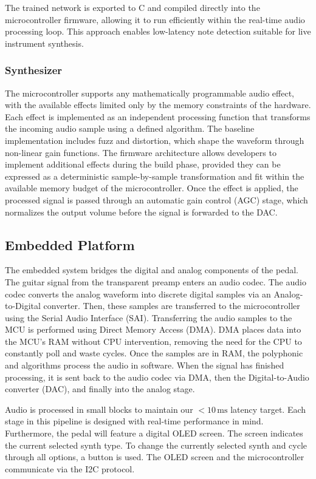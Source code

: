 \documentclass[12pt]{article}
\begin{document}
The trained network is exported to C and compiled directly into the microcontroller firmware, allowing it to run efficiently within the real-time audio processing loop. This approach enables low-latency note detection suitable for live instrument synthesis.
\subsubsection{Synthesizer}

The microcontroller supports any mathematically programmable audio effect, with the available effects limited only by the memory constraints of the hardware. Each effect is implemented as an independent processing function that transforms the incoming audio sample using a defined algorithm. The baseline implementation includes fuzz and distortion, which shape the waveform through non-linear gain functions. The firmware architecture allows developers to implement additional effects during the build phase, provided they can be expressed as a deterministic sample-by-sample transformation and fit within the available memory budget of the microcontroller. Once the effect is applied, the processed signal is passed through an automatic gain control (AGC) stage, which normalizes the output volume before the signal is forwarded to the DAC.

\subsection{Embedded Platform}
The embedded system bridges the digital and analog components of the pedal. The guitar signal from the transparent preamp enters an audio codec. The audio codec converts the analog waveform into discrete digital samples via an Analog-to-Digital converter. Then, these samples are transferred to the microcontroller using the Serial Audio Interface (SAI). Transferring the audio samples to the MCU is performed using Direct Memory Access (DMA). DMA places data into the MCU's RAM without CPU intervention, removing the need for the CPU to constantly poll and waste cycles. Once the samples are in RAM, the polyphonic and algorithms process the audio in software. When the signal has finished processing, it is sent back to the audio codec via DMA, then the Digital-to-Audio converter (DAC), and finally into the analog stage.

Audio is processed in small blocks to maintain our $<10\,\text{ms}$ latency target. Each stage in this pipeline is designed with real-time performance in mind. Furthermore, the pedal will feature a digital OLED screen. The screen indicates the current selected synth type. To change the currently selected synth and cycle through all options, a button is used. The OLED screen and the microcontroller communicate via the I2C protocol.
\end{document}
